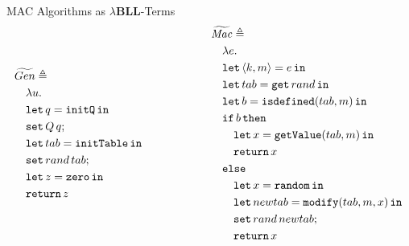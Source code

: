 \documentclass{beamer}[aspectratio=169]
\newcommand{\lamBLL}{{\lambda}\mathbf{BLL}}
\begin{document}
\begin{frame}{MAC Algorithms as \texorpdfstring{$\lamBLL$-Terms}{Lambda-BLL-Terms}}
    \footnotesize{
    \begin{align*}
        \begin{aligned}
            &\widetilde{Gen} \triangleq \\
            &\quad \lambda u. \\
            &\quad\mathtt{let}\,q=\mathtt{initQ}\,\mathtt{in}\, \\
            &\quad \mathtt{set}\,Q\,q; \\
            &\quad \mathtt{let}\,tab=\mathtt{initTable}\,\mathtt{in}\, \\
            &\quad \mathtt{set}\,rand\,tab; \\
            &\quad \mathtt{let}\,z=\mathtt{zero}\,\mathtt{in}\, \\
            &\quad \mathtt{return}\, z
        \end{aligned}
        \qquad\qquad\qquad
        \begin{aligned}
            &\widetilde{\mathit{Mac}} \triangleq \\
            &\quad\lambda e. \\
            &\quad\mathtt{let}\,\langle k,m \rangle = e\,\mathtt{in}\, \\
            &\quad\mathtt{let}\,tab = \mathtt{get}\,rand\,\mathtt{in}\, \\
            &\quad\mathtt{let}\,b = \mathtt{isdefined}(tab, m)\,\mathtt{in}\, \\
            &\quad\mathtt{if}\, b\, \mathtt{then} \\
            &\quad\quad \mathtt{let}\,x = \mathtt{getValue}(tab, m)\,\mathtt{in}\, \\
            &\quad\quad \mathtt{return}\, x \\
            &\quad\mathtt{else} \\
            &\quad\quad \mathtt{let}\,x = \mathtt{random}\,\mathtt{in}\, \\
            &\quad\quad \mathtt{let}\,newtab = \mathtt{modify}(tab, m, x)\,\mathtt{in}\, \\
            &\quad\quad \mathtt{set}\,rand\,newtab; \\
            &\quad\quad \mathtt{return}\, x
        \end{aligned}
    \end{align*}
    }
\end{frame}
\end{document}
